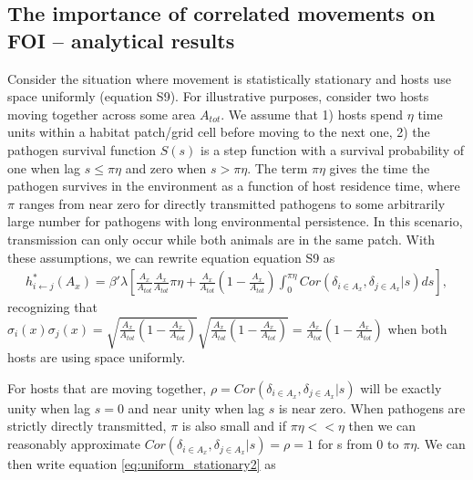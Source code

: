 \documentclass[letterpaper]{article}
\begin{document}
\subsection*{The importance of correlated movements on FOI -- analytical results}

Consider the situation where movement is statistically stationary and hosts use space uniformly (equation S9). 
For illustrative purposes, consider two hosts moving together across some area $A_{tot}$. We assume that 1) hosts spend $\eta$ time units within a habitat patch/grid cell before moving to the next one, 2) the pathogen survival function $S(s)$ is a step function with a survival probability of one when lag $s \leq \pi \eta$ and zero when $s > \pi \eta$.  
The term $\pi \eta$ gives the time the pathogen survives in the environment as a function of host residence time, where $\pi$ ranges from near zero for directly transmitted pathogens to some arbitrarily large number for pathogens with long environmental persistence.  
In this scenario, transmission can only occur while both animals are in the same patch. With these assumptions, we can rewrite equation equation S9 as 
\begin{equation}
    \begin{aligned}
        h^*_{i \leftarrow j}(A_x) = \beta' \lambda \left[\frac{A_x}{A_{tot}}\frac{A_x}{A_{tot}} \pi \eta + \frac{A_x}{A_{tot}}(1 - \frac{A_x}{A_{tot}}) \int_{0}^{\pi \eta} Cor(\delta_{i \in A_x}, \delta_{j \in A_x} | s) ds\right],
    \end{aligned}
    \label{eq:uniform_stationary2}
\end{equation}
recognizing that $\sigma_i(x) \sigma_j(x) = \sqrt{\frac{A_x}{A_{tot}}(1 - \frac{A_x}{A_{tot}})}\sqrt{\frac{A_x}{A_{tot}}(1 - \frac{A_x}{A_{tot}})} = \frac{A_x}{A_{tot}}(1 - \frac{A_x}{A_{tot}})$ when both hosts are using space uniformly.


For hosts that are moving together, $\rho = Cor(\delta_{i \in A_x}, \delta_{j \in A_x} | s)$ will be exactly unity when lag $s = 0$ and near unity when lag $s$ is near zero. When pathogens are strictly directly transmitted, $\pi$ is also small and if $\pi \eta << \eta$ then we can reasonably approximate $Cor(\delta_{i \in A_x}, \delta_{j \in A_x} | s) = \rho = 1$ for s from 0 to $\pi \eta$.  We can then write equation \ref{eq:uniform_stationary2} as 
\end{document}
